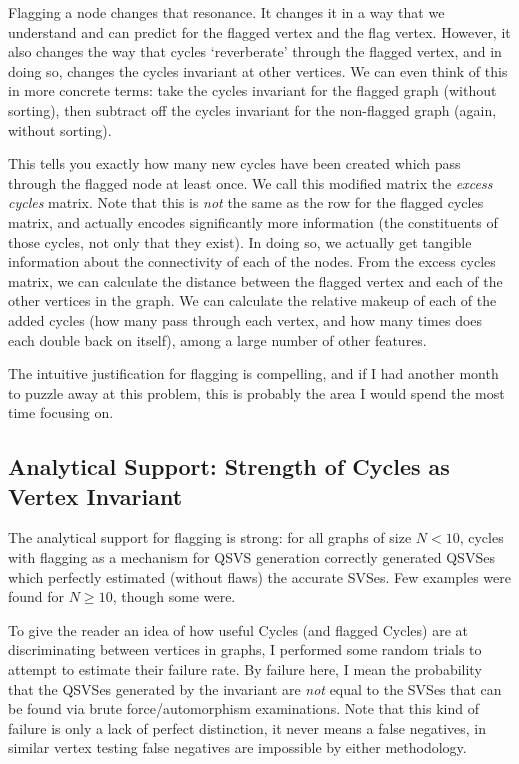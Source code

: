 Flagging a node changes that resonance.
It changes it in a way that we understand and can predict for the flagged vertex and the flag vertex.
However, it also changes the way that cycles `reverberate' through the flagged vertex, and in doing so, changes the cycles invariant at other vertices.
We can even think of this in more concrete terms: take the cycles invariant for the flagged graph (without sorting), then subtract off the cycles invariant for the non-flagged graph (again, without sorting).

This tells you exactly how many new cycles have been created which pass through the flagged node at least once.
We call this modified matrix the \emph{excess cycles} matrix.
Note that this is \emph{not} the same as the row for the flagged cycles matrix, and actually encodes significantly more information (the constituents of those cycles, not only that they exist).
In doing so, we actually get tangible information about the connectivity of each of the nodes.
From the excess cycles matrix, we can calculate the distance between the flagged vertex and each of the other vertices in the graph.
We can calculate the relative makeup of each of the added cycles (how many pass through each vertex, and how many times does each double back on itself), among a large number of other features.

The intuitive justification for flagging is compelling, and if I had another month to puzzle away at this problem, this is probably the area I would spend the most time focusing on.

\subsection{Analytical Support: Strength of Cycles as Vertex Invariant}

The analytical support for flagging is strong:
for all graphs of size $N < 10$, cycles with flagging as a mechanism for QSVS generation correctly generated QSVSes which perfectly estimated (without flaws) the accurate SVSes.
Few examples were found for $N \geq 10$, though some were.

To give the reader an idea of how useful Cycles (and flagged Cycles) are at discriminating between vertices in graphs, I performed some random trials to attempt to estimate their failure rate.
By failure here, I mean the probability that the QSVSes generated by the invariant are \emph{not} equal to the SVSes that can be found via brute force/automorphism examinations.
Note that this kind of failure is only a lack of perfect distinction, it never means a false negatives, in similar vertex testing false negatives are impossible by either methodology.

